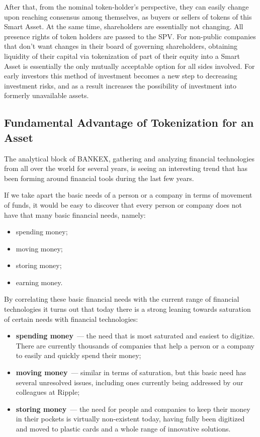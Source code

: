 \documentclass{article}
\begin{document}
\begin{multicols}{2}
After that, from the nominal token-holder’s perspective, they can easily change upon reaching consensus among themselves, as buyers or sellers of tokens of this Smart Asset. At the same time, shareholders are essentially not changing. All presence rights of token holders are passed to the SPV. For non-public companies that don’t want changes in their board of governing shareholders, obtaining liquidity of their capital via tokenization of part of their equity into a Smart Asset is essentially the only mutually acceptable option for all sides involved. 
For early investors this method of investment becomes a new step to decreasing investment risks, and as a result increases the possibility of investment into formerly unavailable assets.

\subsection{Fundamental Advantage of Tokenization for an Asset}

The analytical block of BANKEX, gathering and analyzing financial technologies from all over the world for several years, is seeing an interesting trend that has been forming around financial tools during the last few years. 

If we take apart the basic needs of a person or a company in terms of movement of funds, it would be easy to discover that every person or company does not have that many basic financial needs, namely:
    
\begin{itemize}
\item spending money;
\item moving money;
\item storing money;
\item earning money.
\end{itemize}

By correlating these basic financial needs with the current range of financial technologies it turns out that today there is a strong leaning towards saturation of certain needs with financial technologies:

\begin{itemize}
\item \textbf{spending money}~--- the need that is most saturated and easiest to digitize. There are currently thousands of companies that help a person or a company to easily and quickly spend their money;
\item \textbf{moving money}~--- similar in terms of saturation, but this basic need has several unresolved issues, including ones currently being addressed by our colleagues at Ripple;
\item \textbf{storing money}~--- the need for people and companies to keep their money in their pockets is virtually non-existent today, having fully been digitized and moved to plastic cards and a whole range of innovative solutions. 
\end{itemize}


\end{multicols}
\end{document}
